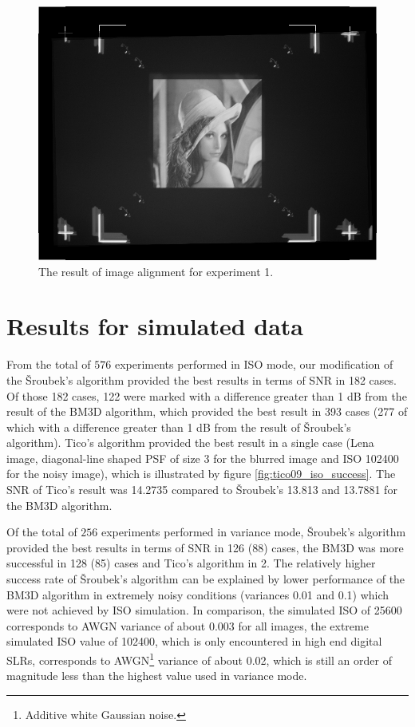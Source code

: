 \documentclass[12pt,notitlepage]{report}
\begin{document}
\begin{figure}[htb]
 \centering
  \includegraphics[width=12cm]{alignment_process.png}
 \caption{The result of image alignment for experiment 1.}
 \label{fig:alignment_process}
\end{figure}


\section{Results for simulated data}
\label{sec:simulated_data}

From the total of $576$ experiments performed in ISO mode, our modification of the Šroubek's algorithm provided the best results in terms of SNR in 182 cases. Of those 182 cases, 122 were marked with a difference greater than 1 dB from the result of the BM3D algorithm, which provided the best result in 393 cases (277 of which with a difference greater than 1 dB from the result of Šroubek's algorithm). Tico's algorithm provided the best result in a single case (Lena image, diagonal-line shaped PSF of size 3 for the blurred image and ISO 102400 for the noisy image), which is illustrated by figure \ref{fig:tico09_iso_success}.  The SNR of Tico's result was 14.2735 compared to Šroubek's 13.813 and 13.7881 for the BM3D algorithm.

Of the total of $256$ experiments performed in variance mode, Šroubek's algorithm provided the best results in terms of SNR in 126 (88) cases, the BM3D was more successful in 128 (85) cases and Tico's algorithm in 2. The relatively higher success rate of Šroubek's algorithm can be explained by lower performance of the BM3D algorithm in extremely noisy conditions (variances 0.01 and 0.1) which were not achieved by ISO simulation. In comparison, the simulated ISO of 25600 corresponds to AWGN variance of about 0.003 for all images, the extreme simulated ISO value of 102400, which is only encountered in high end digital SLRs, corresponds to AWGN\footnote[6]{Additive white Gaussian noise.} variance of about 0.02, which is still an order of magnitude less than the highest value used in variance mode. 
\end{document}
